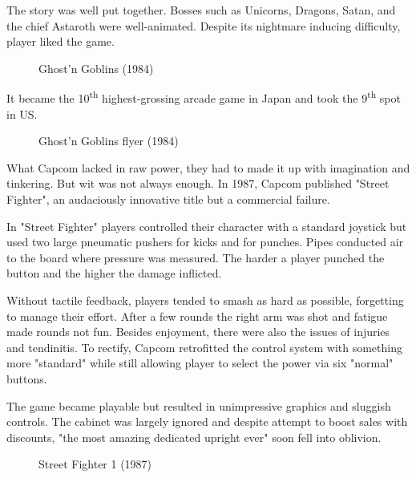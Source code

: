 The story was well put together. Bosses such as Unicorns, Dragons, Satan, and the chief Astaroth were well-animated. Despite its nightmare inducing difficulty, player liked the game. 

\vfill 

\begin{figure}[H]
\caption*{Ghost’n Goblins (1984)}
\end{figure}
\pagebreak

It became the 10\textsuperscript{th} highest-grossing arcade game in Japan and took the 9\textsuperscript{th} spot in US.
\vfill 
\begin{figure}[H]
\caption*{Ghost’n Goblins flyer (1984)}
\end{figure}
\pagebreak

What Capcom lacked in raw power, they had to made it up with imagination and tinkering. But wit was not always enough. In 1987, Capcom published "Street Fighter", an audaciously innovative title but a commercial failure.

In "Street Fighter" players controlled their character with a standard joystick but used two large pneumatic pushers for kicks and for punches. Pipes conducted air to the board where pressure was measured. The harder a player punched the button and the higher the damage inflicted.

Without tactile feedback, players tended to smash as hard as possible, forgetting to manage their effort. After a few rounds the right arm was shot and fatigue made rounds not fun. Besides enjoyment, there were also the issues of injuries and tendinitis. To rectify, Capcom retrofitted the control system with something more "standard" while still allowing player to select the power via six "normal" buttons. 

The game became playable but resulted in unimpressive graphics and sluggish controls. The cabinet was largely ignored and despite attempt to boost sales with discounts, "the most amazing dedicated upright ever" soon fell into oblivion.


\begin{figure}[H]
\caption*{Street Fighter 1 (1987)}
\end{figure}



